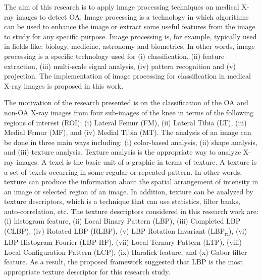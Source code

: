 \documentclass[review]{elsarticle}
\begin{document}
The aim of this research is to apply image processing techniques on medical X-ray images to detect OA. Image processing is a technology in which algorithms can be used to enhance the image or extract some useful features from the image to study for any specific purpose. Image processing is, for example, typically used in fields like: biology, medicine, astronomy and biometrics. In other words, image processing is a specific technology used for (i) classification, (ii) feature extraction, (iii) multi-scale signal analysis, (iv) pattern recognition and (v) projection. The implementation of image processing for classification in medical X-ray images is proposed in this work. 

The motivation of the research presented is on the classification of the OA and non-OA X-ray images from four sub-images of the knee in terms of the following regions of interest (ROI): (i) Lateral Femur (FM), (ii) Lateral Tibia (LT), (iii) Medial Femur (MF), and (iv) Medial Tibia (MT). The analysis of an image can be done in three main ways including: (i) color-based analysis, (ii) shape analysis, and (iii) texture analysis. Texture analysis is the appropriate way to analyze X-ray images. A texel is the basic unit of a graphic in terms of texture. A texture is a set of texels occurring in some regular or repeated pattern. In other words, texture can produce the information about the spatial arrangement of intensity in an image or selected region of an image. In addition, texture can be analyzed by texture descriptors, which is a technique that can use statistics, filter banks, auto-correlation, etc. The texture descriptors considered in this research work are: (i) histogram feature, (ii) Local Binary Pattern (LBP), (iii) Completed LBP (CLBP), (iv) Rotated LBP (RLBP), (v) LBP Rotation Invariant (LBP\textsubscript{ri}), (vi) LBP Histogram Fourier (LBP-HF), (vii) Local Ternary Pattern (LTP), (viii) Local Configuration Pattern (LCP), (ix) Haralick feature, and (x) Gabor filter feature. As a result, the proposed framework suggested that LBP is the most appropriate texture descriptor for this research study. 

\end{document}
